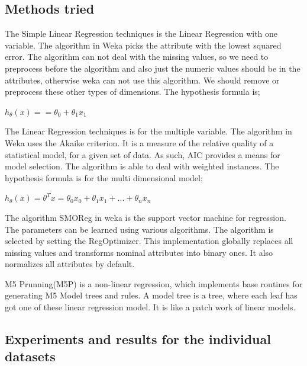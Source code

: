 \documentclass[a4paper]{article}
\begin{document}
\subsection{Methods tried}

    The Simple Linear Regression techniques is the Linear Regression with one variable. The algorithm in Weka picks the attribute with the lowest squared error. The algorithm can not deal with the missing values, so we need to preprocess before the algorithm and also just the numeric values should be in the attributes, otherwise weka can not use this algorithm. We should remove or preprocess these other types of dimensions. The hypothesis formula is;

$h_\theta (x) = =\theta_0+ \theta_1 x_1$

     The Linear Regression techniques is for the multiple variable. The algorithm in Weka uses the Akaike criterion. It is a measure of the relative quality of a statistical model, for a given set of data. As such, AIC provides a means for model selection. The algorithm is able to deal with weighted instances. The hypothesis formula is for the multi dimensional model;

$h_\theta (x) = \theta^T x =\theta_0 x_0+ \theta_1 x_1 + ... + \theta_n x_n$

     The algorithm SMOReg in weka is the support vector machine for regression. The parameters can be learned using various algorithms. The algorithm is selected by setting the RegOptimizer. This implementation globally replaces all missing values and transforms nominal attributes into binary ones. It also normalizes all attributes by default.

     M5 Prunning(M5P)  is a non-linear regression, which implements base routines for generating M5 Model trees and rules. A model tree is a tree, where each leaf has got one of these linear regression model. It is like a patch work of linear models.  

\subsection{Experiments and results for the individual datasets}
\end{document}
